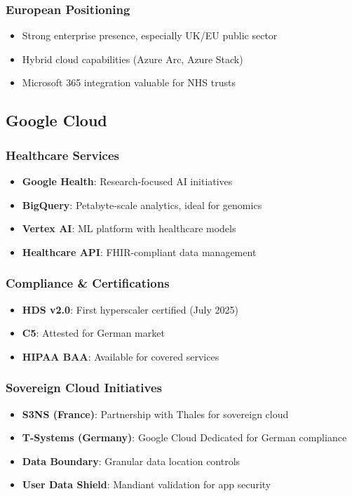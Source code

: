 \documentclass[11pt,a4paper]{article}
\begin{document}
\subsubsection{European Positioning}
\begin{itemize}
    \item Strong enterprise presence, especially UK/EU public sector
    \item Hybrid cloud capabilities (Azure Arc, Azure Stack)
    \item Microsoft 365 integration valuable for NHS trusts
\end{itemize}

\subsection{Google Cloud}

\subsubsection{Healthcare Services}
\begin{itemize}
    \item \textbf{Google Health}: Research-focused AI initiatives
    \item \textbf{BigQuery}: Petabyte-scale analytics, ideal for genomics
    \item \textbf{Vertex AI}: ML platform with healthcare models
    \item \textbf{Healthcare API}: FHIR-compliant data management
\end{itemize}

\subsubsection{Compliance \& Certifications}
\begin{itemize}
    \item \textbf{HDS v2.0}: First hyperscaler certified (July 2025)
    \item \textbf{C5}: Attested for German market
    \item \textbf{HIPAA BAA}: Available for covered services
\end{itemize}

\subsubsection{Sovereign Cloud Initiatives}
\begin{itemize}
    \item \textbf{S3NS (France)}: Partnership with Thales for sovereign cloud
    \item \textbf{T-Systems (Germany)}: Google Cloud Dedicated for German compliance
    \item \textbf{Data Boundary}: Granular data location controls
    \item \textbf{User Data Shield}: Mandiant validation for app security
\end{itemize}
\end{document}
